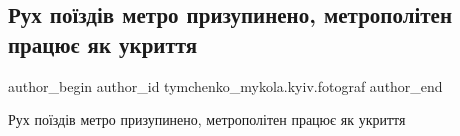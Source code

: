  
 
 
 
 
 
\subsection{Рух поїздів метро призупинено, метрополітен працює як укриття}
\label{sec:16_12_2022.fb.tymchenko_mykola.kyiv.fotograf.1.metro}
 
\ifcmt
 author_begin
   author_id tymchenko_mykola.kyiv.fotograf
 author_end
\fi

Рух поїздів метро призупинено, метрополітен працює як укриття 

